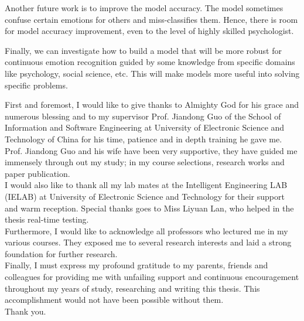 \documentclass[master]{thesis-uestc}
\begin{document}
Another future work is to improve the model accuracy. The model sometimes confuse certain emotions for others and miss-classifies them. Hence, there is room for model accuracy improvement, even to the level of highly skilled psychologist.

Finally, we can investigate how to build a model that will be more robust for continuous emotion recognition guided by some knowledge from specific domains like psychology, social science, etc. This will make models more useful into solving specific problems.

\thesisacknowledgement
First and foremost, I would like to give thanks to Almighty God for his grace and numerous blessing and to my supervisor Prof. Jiandong Guo of the School of Information and Software Engineering at University of Electronic Science and Technology of China for his time, patience and in depth training he gave me. Prof. Jiandong Guo and his wife have been very supportive, they have guided me immensely through out my study; in my course selections, research works and paper publication.\\
I would also like to thank all my lab mates at the Intelligent Engineering LAB (IELAB) at University of Electronic Science and Technology for their support and warm reception. Special thanks goes to Miss Liyuan Lan, who helped in the thesis real-time testing.\\
Furthermore, I would like to acknowledge all professors who lectured me in my various courses. They exposed me to several research interests and laid a strong foundation for further research.\\
Finally, I must express my profound gratitude to my parents, friends and colleagues for providing me with unfailing support and continuous encouragement throughout my years of study, researching and writing this thesis. This accomplishment would not have been possible without them. \\
Thank you.


%
% 
%


%

\end{document}
